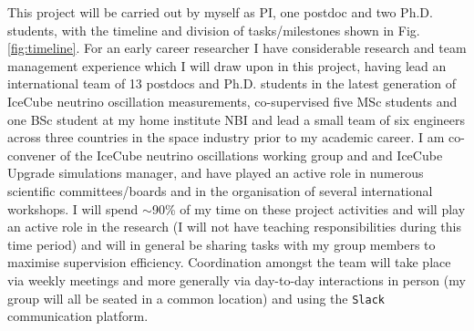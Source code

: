 \documentclass[a4paper,11pt]{article}
\begin{document}
	



This project will be carried out by myself as PI, one postdoc and two Ph.D. students, with the timeline and division of tasks/milestones shown in Fig. \ref{fig:timeline}. For an early career researcher I have considerable research and team management experience which I will draw upon in this project, having lead an international team of 13 postdocs and Ph.D. students in the latest generation of IceCube neutrino oscillation measurements, co-supervised five MSc students and one BSc student at my home institute NBI and lead a small team of six engineers across three countries in the space industry prior to my academic career. I am co-convener of the IceCube neutrino oscillations working group and and IceCube Upgrade simulations manager, and have played an active role in numerous scientific committees/boards and in the organisation of several international workshops. I will spend $\sim$90\% of my time on these project activities and will play an active role in the research (I will not have teaching responsibilities during this time period) and will in general be sharing tasks with my group members to maximise supervision efficiency. Coordination amongst the team will take place via weekly meetings and more generally via day-to-day interactions in person (my group will all be seated in a common location) and using the \texttt{Slack} communication platform. 
\end{document}
